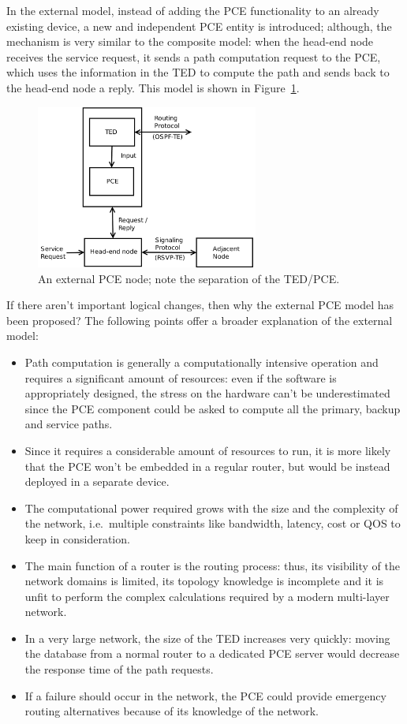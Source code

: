 \documentclass[10pt,a4paper]{report}
\begin{document}
In the external model, instead of adding the PCE functionality to an
already existing device, a new and independent PCE entity is
introduced; although, the mechanism is very similar to the composite
model: when the head-end node receives the service request, it sends a
path computation request to the PCE, which uses the information in the
TED to compute the path and sends back to the head-end node a
reply. This model is shown in Figure~\ref{fig:pce_external}.

\begin{figure}[!htbp]
  \centering
  \includegraphics[width=0.65\textwidth]{img/pce_external}
  \caption[External PCE model]{An external PCE node; note the
    separation of the TED/PCE.}
  \label{fig:pce_external}
\end{figure}

If there aren't important logical changes, then why the external PCE
model has been proposed? The following points offer a broader
explanation of the external model:
\begin{itemize}
\item Path computation is generally a computationally intensive
  operation and requires a significant amount of resources: even if
  the software is appropriately designed, the stress on the hardware
  can't be underestimated since the PCE component could be asked to
  compute all the primary, backup and service paths.
\item Since it requires a considerable amount of resources to run, it
  is more likely that the PCE won't be embedded in a regular router,
  but would be instead deployed in a separate device.
\item The computational power required grows with the size and the
  complexity of the network, i.e.\ multiple constraints like
  bandwidth, latency, cost or QOS to keep in consideration.
\item The main function of a router is the routing process: thus, its
  visibility of the network domains is limited, its topology knowledge
  is incomplete and it is unfit to perform the complex calculations
  required by a modern multi-layer network.
\item In a very large network, the size of the TED increases very
  quickly: moving the database from a normal router to a dedicated PCE
  server would decrease the response time of the path requests.
\item If a failure should occur in the network, the PCE could provide
  emergency routing alternatives because of its knowledge of the
  network.
\end{itemize}
\end{document}
